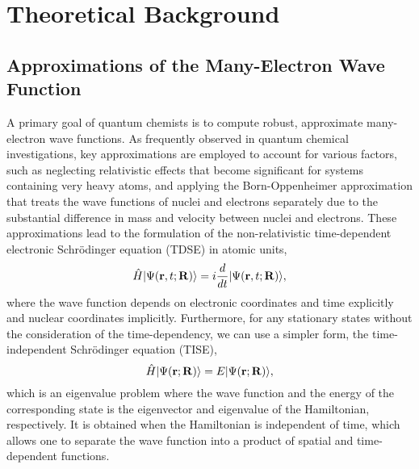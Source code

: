 \chapter{Theoretical Background}  \label{theory} 
\section{Approximations of the Many-Electron Wave Function}\label{approx-wfn}
A primary goal of quantum chemists is to compute robust, approximate many-electron wave functions. As frequently observed in quantum chemical investigations, key approximations are employed to account for various factors, such as neglecting relativistic effects\cite{Pitzer1979} that become significant for systems containing very heavy atoms, and applying the Born-Oppenheimer approximation\cite{Born1927} that treats the wave functions of nuclei and electrons separately due to the substantial difference in mass and velocity between nuclei and electrons. These approximations lead to the formulation of the non-relativistic time-dependent electronic Schr\"odinger equation\cite{Schrodinger1982} (TDSE) in atomic units,
\begin{equation}
\hat{H}| \Psi(\mathbf{r}, t; \mathbf{R}) \rangle = i\frac{d}{dt}| \Psi(\mathbf{r}, t; \mathbf{R}) \rangle,
\end{equation}
where the wave function depends on electronic coordinates and time explicitly and nuclear coordinates implicitly. Furthermore, for any stationary states without the consideration of the time-dependency, we can use a simpler form, the time-independent Schr\"odinger equation (TISE), 
\begin{equation}
\hat{H}| \Psi(\mathbf{r}; \mathbf{R}) \rangle = E| \Psi(\mathbf{r}; \mathbf{R}) \rangle,
\end{equation}
which is an eigenvalue problem where the wave function and the energy of the corresponding state is the eigenvector and eigenvalue of the Hamiltonian, respectively. It is obtained when the Hamiltonian is independent of time, which allows one to separate the wave function into a product of spatial and time-dependent functions.

